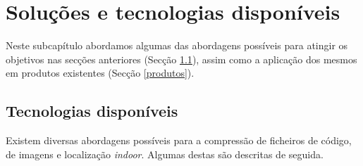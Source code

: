 \section{Soluções e tecnologias disponíveis} \label{solucoesDisponiveis}

Neste subcapítulo abordamos algumas das abordagens possíveis para atingir os objetivos nas secções anteriores (Secção \ref{compressaoFicheiros}), assim como a aplicação dos mesmos em produtos existentes (Secção \ref{produtos}).


\subsection{Tecnologias disponíveis} \label{compressaoFicheiros}

Existem diversas abordagens possíveis para a compressão de ficheiros de código, de imagens e localização \textit{indoor}. Algumas destas são descritas de seguida.

